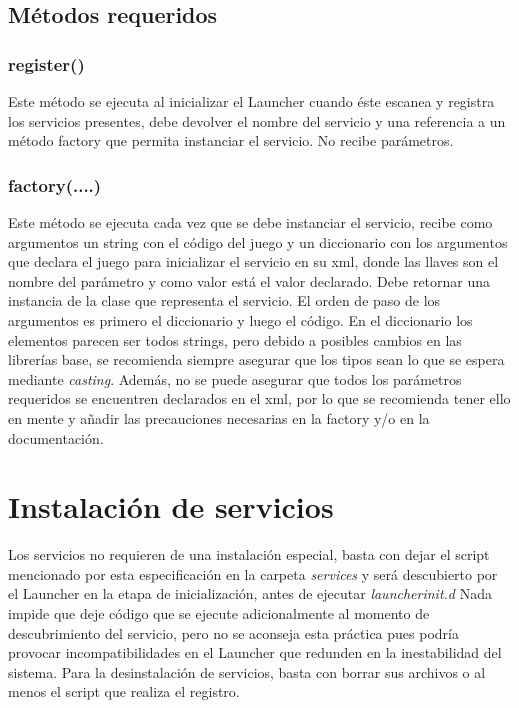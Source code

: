 \documentclass[language=spanish]{article}
\begin{document}
\subsection{Métodos requeridos}

\subsubsection{register()}

Este método se ejecuta al inicializar el Launcher cuando éste escanea y registra los servicios presentes, debe devolver el nombre del servicio y una referencia a un método factory que permita instanciar el servicio. No recibe parámetros.

\subsubsection{factory(....)}

Este método se ejecuta cada vez que se debe instanciar el servicio, recibe como argumentos un string con el código del juego y un diccionario con los argumentos que declara el juego para inicializar el servicio en su xml, donde las llaves son el nombre del parámetro y como valor está el valor declarado. Debe retornar una instancia de la clase que representa el servicio.
El orden de paso de los argumentos es primero el diccionario y luego el código. En el diccionario los elementos parecen ser todos strings, pero debido a posibles cambios en las librerías base, se recomienda siempre asegurar que los tipos sean lo que se espera mediante {\em casting}. Además, no se puede asegurar que todos los parámetros requeridos se encuentren declarados en el xml, por lo que se recomienda tener ello en mente y añadir las precauciones necesarias en la factory y/o en la documentación.

\section{Instalación de servicios}

Los servicios no requieren de una instalación especial, basta con dejar el script mencionado por esta especificación en la carpeta {\em services} y será descubierto por el Launcher en la etapa de inicialización, antes de ejecutar {\em launcherinit.d}
Nada impide que deje código que se ejecute adicionalmente al momento de descubrimiento del servicio, pero no se aconseja esta práctica pues podría provocar incompatibilidades en el Launcher que redunden en la inestabilidad del sistema.
Para la desinstalación de servicios, basta con borrar sus archivos o al menos el script que realiza el registro.
\end{document}
